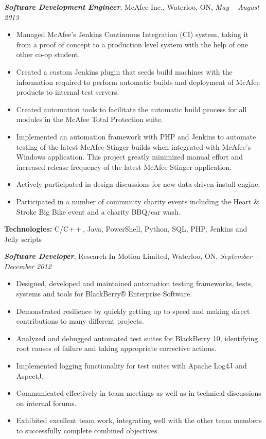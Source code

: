 \documentclass[10pt,letterpaper]{article}
\newcommand{\job}[4]
{
    \emph{\textbf{#1}}, #2, #3, \emph{#4}
}
\begin{document}
\vspace{0.5em}		
\job{Software Development Engineer}{McAfee Inc.}{Waterloo, ON}{May -- August 2013}\\
\begin{adjustwidth}{0.1in}{0.5in}
    \begin{itemize}
	\item Managed McAfee's Jenkins Continuous Integration (CI) system, taking it from a proof of concept to a production level system with the help 
	    of one other co-op student.
	\item Created a custom Jenkins plugin that seeds build machines with the information required to perform automatic builds and 
	    deployment of McAfee products to internal test servers.
	\item Created automation tools to facilitate the automatic build process for all modules in the 
	    McAfee Total Protection suite.
	\item Implemented an automation framework with PHP and Jenkins to automate testing of the latest McAfee Stinger builds when integrated  
	    with McAfee's Windows application. This project greatly minimized manual effort and increased release frequency of the latest McAfee Stinger application.  
    	\item Actively participated in design discussions for new data driven install engine.
	\item Participated in a number of community charity events including the Heart \& Stroke Big Bike event and a charity BBQ/car wash.
    \end{itemize}
    \vspace{0.5em}
    \textbf{Technologies:} C/C$++$, Java, PowerShell, Python, SQL, PHP, Jenkins and Jelly scripts
\end{adjustwidth}
\newpage
\job{Software Developer}{Research In Motion Limited}{Waterloo, ON}{September -- December 2012}\\
\begin{adjustwidth}{0.1in}{0.5in}
    \begin{itemize}
	\item Designed, developed and maintained automation testing frameworks, tests, systems and tools for 
	    BlackBerry® Enterprise Software.
	\item Demonstrated resilience by quickly getting up to speed and making direct contributions to many different 
	    projects.
	\item Analyzed and debugged automated test suites for BlackBerry 10, identifying root causes of failure and 
	    taking appropriate corrective actions.
	\item Implemented logging functionality for test suites with Apache Log4J and AspectJ.
	\item Communicated effectively in team meetings as well as in technical discussions on internal forums.
	\item Exhibited excellent team work, integrating well with the other team members to successfully complete 
	    combined objectives.
    \end{itemize}
\end{adjustwidth}
\end{document}
